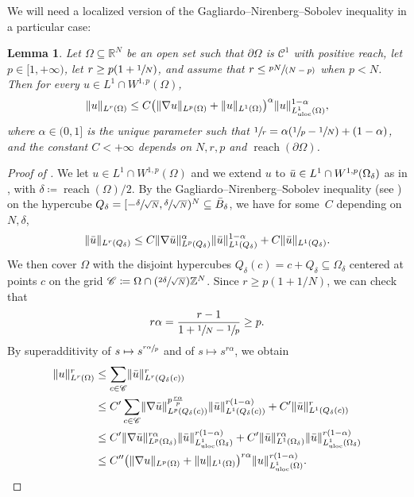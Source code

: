 \documentclass[JEP,XML,SOM,Unicode,published]{cedram}
\newcommand{\Psfrac}[2]{{(\sfrac{#1}{#2})}}
\newcommand{\spfrac}[2]{{\sfrac{#1}{(#2)}}}
\theoremstyle{plain}
\newtheorem{lemma}[theorem]{Lemma}
\theoremstyle{definition}
\newcommand{\R}{\mathbb{R}}
\newcommand{\Z}{\mathbb{Z}}
\newcommand{\Cspace}{\mathscr{C}}
\newcommand{\uloc}{L^1_\mathrm{uloc}}
\DeclarePairedDelimiter{\norm}{\lVert}{\rVert}
\DeclareMathOperator{\reach}{reach}
\begin{document}
We will need a localized version of the Gagliardo--Nirenberg--Sobolev inequality in a particular case:
\begin{lemma}\label{lemmaGagliardo}
Let \(\Omega\subseteq\R^N\) be an open set such that \(\partial\Omega\) is \(\Cspace^1\) with positive reach, let \(p\in [1,+\infty)\), let \(r\geq p(1+\sfrac{1}{N})\), and assume that \(r\leq\spfrac{pN}{N-p}\) when \(p<N\). Then for every \(u\in L^1\cap W^{1,p}(\Omega)\),
\[
\norm{u}_{L^r(\Omega)}\leq C \bigl(\norm{\nabla u}_{L^p(\Omega)}+\norm{u}_{L^1(\Omega)}\bigr)^\alpha \norm{u}_{\uloc({\Omega})}^{1-\alpha},
\]
where \(\alpha\in (0,1]\) is the unique parameter such that \(\sfrac 1r=\alpha (\sfrac 1p-\sfrac 1N)+(1-\alpha)\), and the constant \(C<+\infty\) depends on \(N,r,p\) and \(\reach(\partial\Omega)\).
\end{lemma}
\begin{proof}[Proof of ]
We let \(u\in L^1\cap W^{1,p}(\Omega)\) and we extend \(u\) to \(\Bar{u}\in L^1\cap W^{1,p}(\Omega_\delta)\) as in , with $\delta \coloneqq \reach(\Omega)/2$. By the Gagliardo--Nirenberg--Sobolev inequality (see \cite{nirenbergEllipticPartialDifferential1959}) on the hypercube \(Q_\delta=[-\sfrac{\delta}{\sqrt{N}},\sfrac{\delta}{\sqrt{N}})^N \subseteq \bar B_\delta\), we have for some~$C$ depending on $N,\delta$,
\[
\norm{\Bar{u}}_{L^r(Q_\delta)}\leq C \norm{\nabla \Bar{u}}_{L^p(Q_\delta)}^\alpha\norm{\Bar{u}}_{L^1(Q_\delta)}^{1-\alpha}+C\norm{\Bar{u}}_{L^1(Q_\delta)}.
\]
We then cover \(\Omega\) with the disjoint hypercubes \(Q_\delta(c)=c+Q_\delta\subseteq\Omega_\delta\) centered at points \(c\) on the grid \(\Cspace\coloneqq\Omega\cap \Psfrac{2\delta}{\sqrt{N}}\Z^N\). Since \(r \geq p(1+1/N)\), we can check that
\begin{equation}\label{superadditiveExponent}
r\alpha=\frac{r-1}{1+\sfrac 1N-\sfrac 1p}\geq p.
\end{equation}
By superadditivity of \(s\mapsto s^{\sfrac{r\alpha}{p}}\) and of \(s\mapsto s^{r\alpha}\), we obtain
\begin{align*}
\norm{u}_{L^r(\Omega)}^r&\leq \sum_{c\in \Cspace}\norm{\Bar{u}}^r_{L^r(Q_\delta(c))}\\
&\leq
C'\sum_{c\in \Cspace}\norm{\nabla \Bar{u}}_{L^p(Q_\delta(c))}^{p\frac{r\alpha}p}\norm{\Bar{u}}_{L^1(Q_\delta(c))}^{r(1-\alpha)}+C'\norm{\Bar{u}}^r_{L^1(Q_\delta(c))}\\
&\leq
C'\norm{\nabla \Bar{u}}_{L^p(\Omega_\delta)}^{r\alpha}\norm{\Bar{u}}_{\uloc({\Omega}_\delta)}^{r(1-\alpha)}+C'\norm{\Bar{u}}_{L^1(\Omega_\delta)}^{r\alpha}\norm{\Bar{u}}_{\uloc({\Omega}_\delta)}^{r(1-\alpha)}\\
&\leq
C''\bigl(\norm{\nabla u}_{L^p(\Omega)}+\norm{u}_{L^1(\Omega)}\bigr)^{r\alpha}\norm{u}_{\uloc({\Omega})}^{r(1-\alpha)}.\qedhere
\end{align*}
\end{proof}
\end{document}
